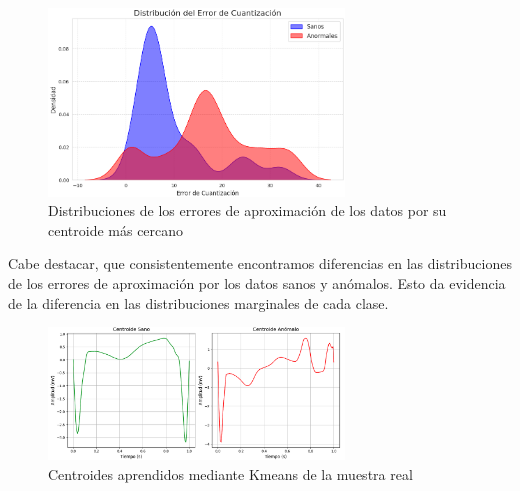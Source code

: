 \documentclass[titlepage,a4paper]{article}
\begin{document}
\begin{figure}[H] %
    \centering
    \includegraphics[width=0.7\textwidth]{distribuciones_error.png} %
    \caption{Distribuciones de los errores de aproximación de los datos por su centroide más cercano}
    \label{fig:mi_figura} %
\end{figure}
Cabe destacar, que consistentemente encontramos diferencias en las distribuciones de los errores de aproximación por los datos sanos y anómalos. Esto da evidencia de la diferencia en las distribuciones marginales de cada clase.

\begin{figure}[H] %
    \centering
    \includegraphics[width=0.7\textwidth]{centroides_kmeans_real.png} %
    \caption{Centroides aprendidos mediante Kmeans de la muestra real}
    \label{fig:mi_figura} %
\end{figure}
\end{document}

